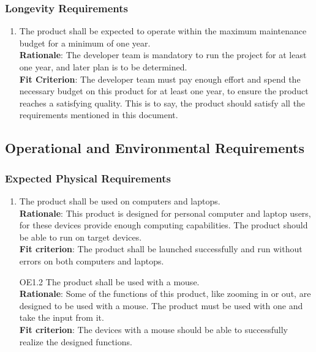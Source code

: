 \documentclass{article}
\begin{document}
\subsubsection{Longevity Requirements}
\begin{enumerate}[PR8.1]
    \item The product shall be expected to operate within the maximum maintenance budget for a minimum of one year.\\
    \textbf{Rationale}: The developer team is mandatory to run the project for at least one year, and later plan is to be determined.\\
    \textbf{Fit Criterion}: The developer team must pay enough effort and spend the necessary budget on this product for at least one year, to ensure the product reaches a satisfying quality. This is to say, the product should satisfy all the requirements mentioned in this document.
\end{enumerate}

\subsection{Operational and Environmental Requirements}
\subsubsection{Expected Physical Requirements}

\begin{enumerate}[OE1.1]
    \item The product shall be used on computers and laptops.\\
    \textbf{Rationale}: This product is designed for personal computer and laptop users, for these devices provide enough computing capabilities. The product should be able to run on target devices.\\
    \textbf{Fit criterion}: The product shall be launched successfully and run without errors on both computers and laptops.\\
   
    \item[OE1.2] The product shall be used with a mouse.\\
    \textbf{Rationale}: Some of the functions of this product, like zooming in or out, are designed to be used with a mouse. The product must be used with one and take the input from it.\\
    \textbf{Fit criterion}: The devices with a mouse should be able to successfully realize the designed functions.\\
\end{enumerate}
\end{document}
